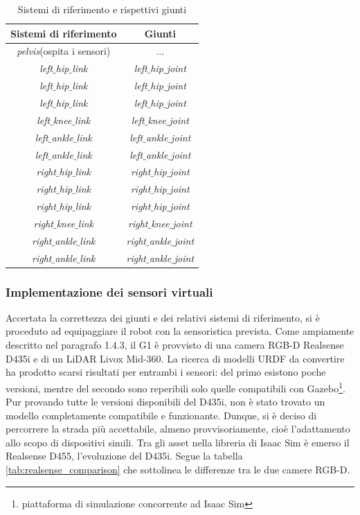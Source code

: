 \begin{table}[h]
    \centering
    \begin{tabular}{|c|c|} 
        \hline
        \textbf{Sistemi di riferimento}& \textbf{Giunti}\\ \hline
        \textit{pelvis}(ospita i sensori)& ...\\ \hline
        \textit{left$\_$hip$\_$link}&\textit{left$\_$hip$\_$joint} \\ \hline
        \textit{left$\_$hip$\_$link}&\textit{left$\_$hip$\_$joint} \\ \hline
        \textit{left$\_$hip$\_$link}& \textit{left$\_$hip$\_$joint}\\ \hline
        \textit{left$\_$knee$\_$link}& \textit{left$\_$knee$\_$joint}\\ \hline
        \textit{left$\_$ankle$\_$link}& \textit{left$\_$ankle$\_$joint}\\ \hline
        \textit{left$\_$ankle$\_$link}& \textit{left$\_$ankle$\_$joint}\\ \hline
        \textit{right$\_$hip$\_$link}& \textit{right$\_$hip$\_$joint}\\ \hline
        \textit{right$\_$hip$\_$link}& \textit{right$\_$hip$\_$joint}\\ \hline
        \textit{right$\_$hip$\_$link}& \textit{right$\_$hip$\_$joint}\\ \hline
        \textit{right$\_$knee$\_$link}& \textit{right$\_$knee$\_$joint}\\ \hline
        \textit{right$\_$ankle$\_$link}& \textit{right$\_$ankle$\_$joint}\\ \hline
        \textit{right$\_$ankle$\_$link}& \textit{right$\_$ankle$\_$joint}\\ \hline
    \end{tabular}
    \caption{Sistemi di riferimento e rispettivi giunti}
    \label{tab:g1_joint_link}
\end{table}

\subsubsection{Implementazione dei sensori virtuali}
Accertata la correttezza dei giunti e dei relativi sistemi di riferimento, si è proceduto ad equipaggiare il robot con la sensoristica prevista. Come ampiamente descritto nel paragrafo 1.4.3, il G1 è provvisto di una camera RGB-D Realsense D435i e di un LiDAR Livox Mid-360. La ricerca di modelli URDF da convertire ha prodotto scarsi risultati per entrambi i sensori: del primo esistono poche versioni, mentre del secondo sono reperibili solo quelle compatibili con Gazebo\footnote{piattaforma di simulazione concorrente ad Isaac Sim}. Pur provando tutte le versioni disponibili del D435i, non è stato trovato un modello completamente compatibile e funzionante. Dunque, si è deciso di percorrere la strada più accettabile, almeno provvisoriamente, cioè l'adattamento allo scopo di dispositivi simili. Tra gli asset nella libreria di Isaac Sim è emerso il Realsense D455, l'evoluzione del D435i. Segue la tabella \ref{tab:realsense_comparison} che sottolinea le differenze tra le due camere RGB-D.

